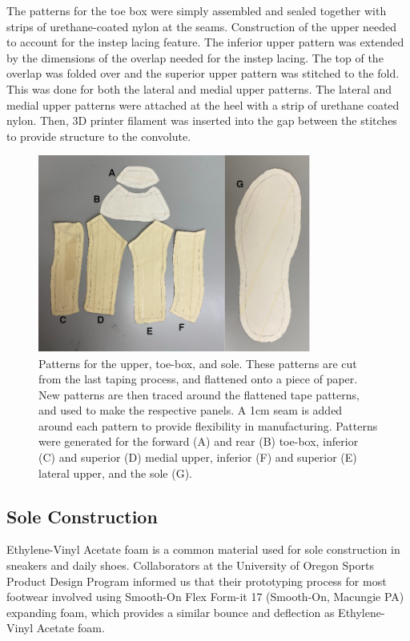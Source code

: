 \documentclass[defaultstyle,11pt]{thesis}
\begin{document}
The patterns for the toe box were simply assembled and sealed together with strips of urethane-coated nylon at the seams.
Construction of the upper needed to account for the instep lacing feature.
The inferior upper pattern was extended by the dimensions of the overlap needed for the instep lacing.
The top of the overlap was folded over and the superior upper pattern was stitched to the fold.
This was done for both the lateral and medial upper patterns.
The lateral and medial upper patterns were attached at the heel with a strip of urethane coated nylon.
Then, 3D printer filament was inserted into the gap between the stitches to provide structure to the convolute.

\hypertarget{fig:SA3-cutpatterns}{%
\begin{figure}
\centering
\includegraphics[width=0.8\textwidth,height=\textheight]{../fig/SA3/cut_patterns.png}
\caption[{Upper, toe-box, and sole patterns}]{Patterns for the upper, toe-box, and sole. These patterns are cut from the last taping process, and flattened onto a piece of paper. New patterns are then traced around the flattened tape patterns, and used to make the respective panels. A 1cm seam is added around each pattern to provide flexibility in manufacturing. Patterns were generated for the forward (A) and rear (B) toe-box, inferior (C) and superior (D) medial upper, inferior (F) and superior (E) lateral upper, and the sole (G).}
\label{fig:SA3-cutpatterns}
\end{figure}
}

\hypertarget{sole-construction}{%
\subsection{Sole Construction}\label{sole-construction}}

Ethylene-Vinyl Acetate foam is a common material used for sole construction in sneakers and daily shoes.
Collaborators at the University of Oregon Sports Product Design Program informed us that their prototyping process for most footwear involved using Smooth-On Flex Form-it 17 (Smooth-On, Macungie PA) expanding foam, which provides a similar bounce and deflection as Ethylene-Vinyl Acetate foam.
\end{document}
